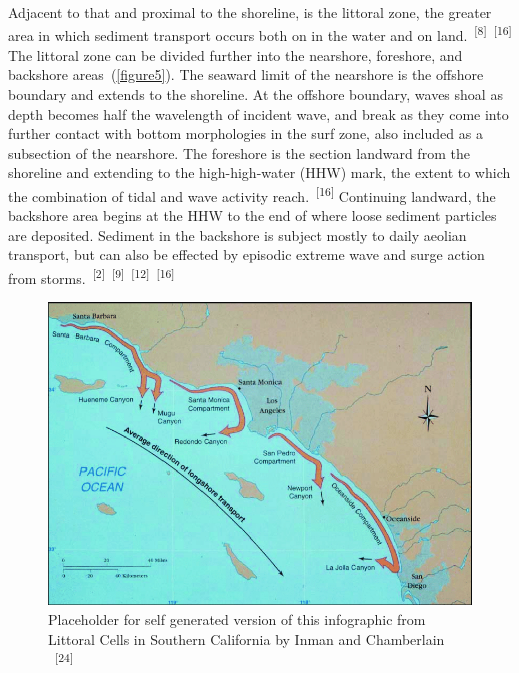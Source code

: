 \documentclass{article}
\begin{document}
\par{Adjacent to that and proximal to the shoreline, is the littoral zone, the greater area in which sediment transport occurs both on in the water and on land.~\textsuperscript{[8]}~\textsuperscript{[16]} The littoral zone can be divided further into the nearshore, foreshore, and backshore areas~(\cref{figure5}). The seaward limit of the nearshore is the offshore boundary and extends to the shoreline. At the offshore boundary, waves shoal as depth becomes half the wavelength of incident wave, and break as they come into further contact with bottom morphologies in the surf zone, also included as a subsection of the nearshore. The foreshore is the section landward from the shoreline and extending to the high-high-water (HHW) mark, the extent to which the combination of tidal and wave activity reach.~\textsuperscript{[16]} Continuing landward, the backshore area begins at the HHW to the end of where loose sediment particles are deposited. Sediment in the backshore is subject mostly to daily aeolian transport, but can also be effected by episodic extreme wave and surge action from storms.~\textsuperscript{[2]}~\textsuperscript{[9]}~\textsuperscript{[12]}~\textsuperscript{[16]}}

\begin{figure}
    \centering
    \includegraphics[width=.9\linewidth]{images/so-cal-littoral-cells.png}
    \caption{Placeholder for self generated version of this infographic from Littoral Cells in Southern California by Inman and Chamberlain ~\textsuperscript{[24]}}
    \label{figure6}
\end{figure}
\end{document}
